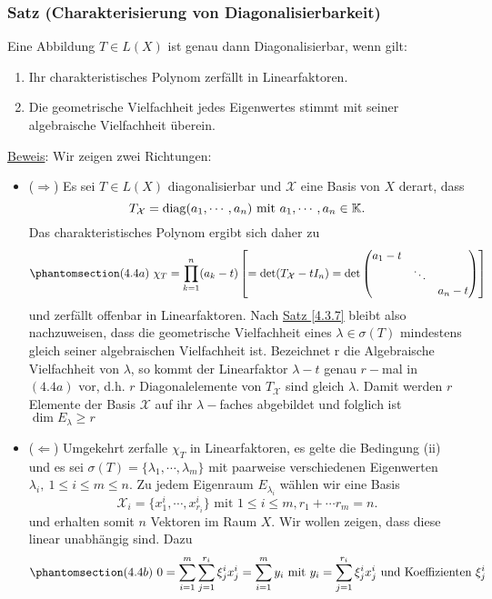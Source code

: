 \subsubsection{Satz (Charakterisierung von Diagonalisierbarkeit)}
\label{4.4.3}
Eine Abbildung $T\in L(X)$ ist genau dann Diagonalisierbar, wenn gilt:
\renewcommand{\labelenumi}{(\roman{enumi})}
\begin{enumerate}
\item Ihr charakteristisches Polynom zerfällt in Linearfaktoren.
\item Die geometrische Vielfachheit jedes Eigenwertes stimmt mit seiner algebraische Vielfachheit überein.
\end{enumerate}
\underline{Beweis}:
Wir zeigen zwei Richtungen:
\renewcommand{\labelitemi}{}
\begin{itemize}
\item ($\Rightarrow$) Es sei $T\in L(X)$ diagonalisierbar und $\mathcal{X}$ eine Basis von $X$ derart, dass \[T_\mathcal{X}=\operatorname{diag}(a_1,\cdots ,a_n)\text{ mit }a_1,\cdots ,a_n\in\mathbb{K}.\]  Das charakteristisches Polynom ergibt sich daher zu 
\[\phantomsection\label{4.4a}(4.4a)\ \chi _T=\prod _{k=1}^n (a_k -t)\left[=\det (T_\mathcal{X}-tI_n)=\det \begin{pmatrix}a_1-t & \ & \ \\ \ & \ddots & \ \\ \ & \ & a_n-t\end{pmatrix}\right]\]
und zerfällt offenbar in Linearfaktoren.  Nach \hyperref[4.3.7]{Satz \ref{4.3.7}} bleibt also nachzuweisen, dass die geometrische Vielfachheit eines $\lambda \in \sigma (T)$ mindestens gleich seiner algebraischen Vielfachheit ist.  Bezeichnet r die Algebraische Vielfachheit von $\lambda$, so kommt der Linearfaktor $\lambda -t$ genau $r-$mal in \hyperref[4.4a]{$(4.4a)$} vor, d.h. $r$ Diagonalelemente von $T_\mathcal{X}$ sind gleich $\lambda$.  Damit werden $r$ Elemente der Basis $\mathcal{X}$ auf ihr $\lambda -$faches abgebildet und folglich ist $\dim E_\lambda \geq r$
\item ($\Leftarrow$) Umgekehrt zerfalle $\chi _T$ in Linearfaktoren, es gelte die Bedingung (ii) und es sei $\sigma (T)=\{\lambda _1,\cdots,\lambda _m\}$ mit paarweise verschiedenen Eigenwerten $\lambda _i,\ 1\leq i\leq m\leq n$.  Zu jedem Eigenraum $E_{\lambda _i}$ wählen wir eine Basis
\[\mathcal{X}_i=\{x_1^i,\cdots ,x_{r_i}^i\}\text{ mit }1\leq i\leq m,r_1+\cdots r_m=n.\]
und erhalten somit $n$ Vektoren im Raum $X$.  Wir wollen zeigen, dass diese linear unabhängig sind.  Dazu 
\[\phantomsection\label{4.4b}(4.4b)\ 0=\sum _{i=1}^m \sum _{j=1}^{r_i}\xi _j^ix_j^i=\sum _{i=1}^m y_i\text{ mit } y_i=\sum _{j=1}^{r_i}\xi _j^i x_j^i\text{ und Koeffizienten }\xi _j^i\]

\end{itemize}
